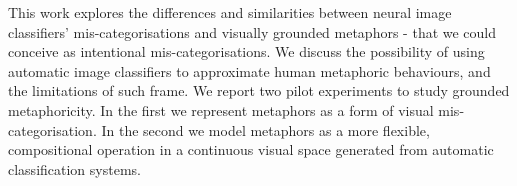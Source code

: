 This work explores the differences and similarities between neural image classifiers' mis-categorisations and visually grounded metaphors - that we could conceive as intentional mis-categorisations. We discuss the possibility of using automatic image classifiers to approximate human metaphoric behaviours, and the limitations of such frame. We report two pilot experiments to study grounded metaphoricity. In the first we represent metaphors as a form of visual mis-categorisation. In the second we model metaphors as a more flexible, compositional operation in a continuous visual space generated from automatic classification systems.
